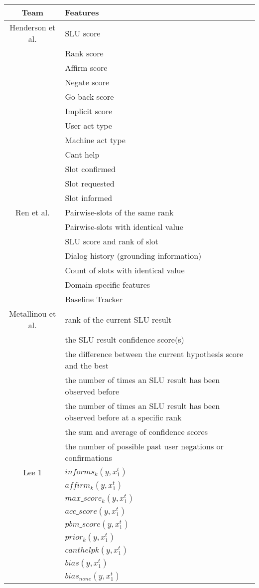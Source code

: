 \begin{tabular}{c|l}\\
Team&Features\\\hline
Henderson et al.&SLU score\\
&Rank score\\
&Affirm score\\
&Negate score\\
&Go back score\\
&Implicit score\\
&User act type\\
&Machine act type\\
&Cant help\\
&Slot confirmed\\
&Slot requested\\
&Slot informed\\\hline
Ren et al.&Pairwise-slots of the same rank\\
&Pairwise-slots with identical value\\
&SLU score and rank of slot\\
&Dialog history (grounding information)\\
&Count of slots with identical value\\
&Domain-specific features\\
&Baseline Tracker\\\hline
Metallinou et al.&rank of the current SLU result\\
&the SLU result confidence score(s)\\
&the difference between the current hypothesis score and the best\\
&the number of times an SLU result has been observed before\\
&the number of times an SLU result has been observed before at a specific rank\\
&the sum and average of confidence scores\\
&the number of possible past user negations or confirmations \\\hline
Lee 1&$informs_k(y,x_1^t)$\\
&$affirm_k(y,x_1^t)$\\
&$max\_score_k(y,x_1^t)$\\
&$acc\_score(y,x_1^t)$\\
&$pbm\_score(y,x_1^t)$\\
&$prior_k(y,x_1^t)$\\
&$canthelpk(y,x_1^t)$\\
&$bias(y,x_1^t)$\\
&$bias_{none}(y,x_1^t)$\\
\end{tabular}\\
